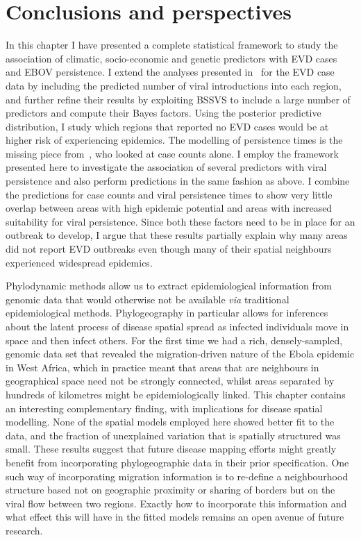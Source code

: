 \section{Conclusions and perspectives}

In this chapter I have presented a complete statistical framework to study the association of climatic, socio-economic and genetic predictors with EVD cases and EBOV persistence.
I extend the analyses presented in~\cite{Dudas2017} for the EVD case data by including the predicted number of viral introductions into each region, and further refine their results by exploiting BSSVS to include a large number of predictors and compute their Bayes factors.
Using the posterior predictive distribution, I study which regions that reported no EVD cases would be at higher risk of experiencing epidemics.
The modelling of persistence times is the missing piece from~\cite{Dudas2017}, who looked at case counts alone.
I employ the framework presented here to investigate the association of several predictors with viral persistence and also perform predictions in the same fashion as above.
I combine the predictions for case counts and viral persistence times to show very little overlap between areas with high epidemic potential and areas with increased suitability for viral persistence.
Since both these factors need to be in place for an outbreak to develop, I argue that these results partially explain why many areas did not report EVD outbreaks even though many of their spatial neighbours experienced widespread epidemics.

Phylodynamic methods allow us to extract epidemiological information from genomic data that would otherwise not be available \textit{via} traditional epidemiological methods.
Phylogeography in particular allows for inferences about the latent process of disease spatial spread as infected individuals move in space and then infect others.
For the first time we had a rich, densely-sampled, genomic data set that revealed the migration-driven nature of the Ebola epidemic in West Africa, which in practice meant that areas that are neighbours in geographical space need not be strongly connected, whilst areas separated by hundreds of kilometres might be epidemiologically linked.
This chapter contains an interesting complementary finding, with implications for disease spatial modelling.
None of the spatial models employed here showed better fit to the data, and the fraction of unexplained variation that is spatially structured was small.
These results suggest that future disease mapping efforts might greatly benefit from incorporating phylogeographic data in their prior specification.
One such way of incorporating migration information is to re-define a neighbourhood structure based not on geographic proximity or sharing of borders but on the viral flow between two regions.
Exactly how to incorporate this information and what effect this will have in the fitted models remains an open avenue of future research.

